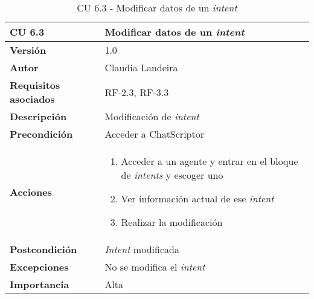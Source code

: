 \begin{table}[p]
	\centering
	\begin{tabularx}{\linewidth}{ p{} p{} }
		\toprule
		\textbf{CU 6.3}    & \textbf{Modificar datos de un \textit{intent}}\\
		\toprule
		\textbf{Versión}              & 1.0    \\
		\textbf{Autor}                & Claudia Landeira \\
		\textbf{Requisitos asociados} & RF-2.3, RF-3.3\\
		\textbf{Descripción}          & Modificación de \textit{intent}\\
		\textbf{Precondición}         & Acceder a ChatScriptor\\
		\textbf{Acciones}             &
		\begin{enumerate}
			\def\labelenumi{\arabic{enumi}.}
			\tightlist
                \item Acceder a un agente y entrar en el bloque de \textit{intents} y escoger uno
                \item Ver información actual de ese \textit{intent}
                \item Realizar la modificación
		\end{enumerate}\\
		\textbf{Postcondición}        & \textit{Intent} modificada  \\
		\textbf{Excepciones}          & No se modifica el \textit{intent} \\
		\textbf{Importancia}          & Alta \\
		\bottomrule
	\end{tabularx}
	\caption{CU 6.3 - Modificar datos de un \textit{intent}}
\end{table}

